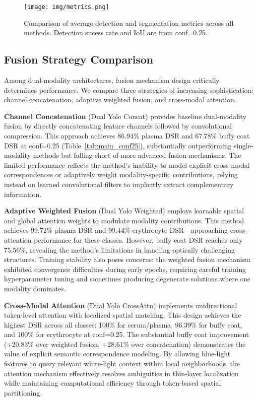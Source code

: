 \documentclass[journal,twoside,web]{ieeecolor}
\begin{document}
\begin{figure}[!t]
\centerline{\texttt{[image: img/metrics.png]}}
\caption{Comparison of average detection and segmentation metrics across all methods. Detection sucess rate and IoU are from conf=0.25.}
\label{fig mechanics}
\end{figure}


\subsection{Fusion Strategy Comparison}

Among dual-modality architectures, fusion mechanism design critically determines performance. We compare three strategies of increasing sophistication: channel concatenation, adaptive weighted fusion, and cross-modal attention.

\textbf{Channel Concatenation} (Dual Yolo Concat) provides baseline dual-modality fusion by directly concatenating feature channels followed by convolutional compression. This approach achieves 86.94\% plasma DSR and 67.78\% buffy coat DSR at conf=0.25 (Table~\ref{tab:main_conf25}), substantially outperforming single-modality methods but falling short of more advanced fusion mechanisms. The limited performance reflects the method's inability to model explicit cross-modal correspondences or adaptively weight modality-specific contributions, relying instead on learned convolutional filters to implicitly extract complementary information.

\textbf{Adaptive Weighted Fusion} (Dual Yolo Weighted) employs learnable spatial and global attention weights to modulate modality contributions. This method achieves 99.72\% plasma DSR and 99.44\% erythrocyte DSR—approaching cross-attention performance for these classes. However, buffy coat DSR reaches only 75.56\%, revealing the method's limitations in handling optically challenging structures. Training stability also poses concerns: the weighted fusion mechanism exhibited convergence difficulties during early epochs, requiring careful training hyperparameter tuning and sometimes producing degenerate solutions where one modality dominates.

\textbf{Cross-Modal Attention} (Dual Yolo CrossAttn) implements unidirectional token-level attention with localized spatial matching. This design achieves the highest DSR across all classes: 100\% for serum/plasma, 96.39\% for buffy coat, and 100\% for erythrocyte at conf=0.25. The substantial buffy coat improvement (+20.83\% over weighted fusion, +28.61\% over concatenation) demonstrates the value of explicit semantic correspondence modeling. By allowing blue-light features to query relevant white-light context within local neighborhoods, the attention mechanism effectively resolves ambiguities in thin-layer localization while maintaining computational efficiency through token-based spatial partitioning.
\end{document}
